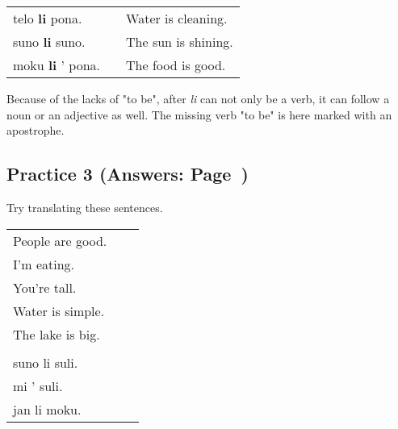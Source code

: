 \begin{supertabular}{p{5cm}|ll}
telo \textbf{li} pona. && Water is cleaning. \\
suno \textbf{li} suno. && The sun is shining. \\
moku \textbf{li} ' pona. && The food is good. \\ %
\end{supertabular} 

Because of the lacks of "to be", after \textit{li} can not only be a verb, it can follow a noun or an adjective as well.
The missing verb "to be" is here marked with an apostrophe. 
%
\subsection*{Practice 3 (Answers: Page~\pageref{'basic_sentences'})}
%
Try translating these sentences. 

\begin{supertabular}{p{5cm}|ll}
People are good. && \\ %
I'm eating. &&  \\ %
You're tall. &&  \\ %
Water is simple. &&  \\ %
The lake is big. &&\\ %
 && \\
suno li suli. &&  \\%
mi ' suli. &&  \\%
jan li moku. &&  \\%
\end{supertabular} \\%
%
